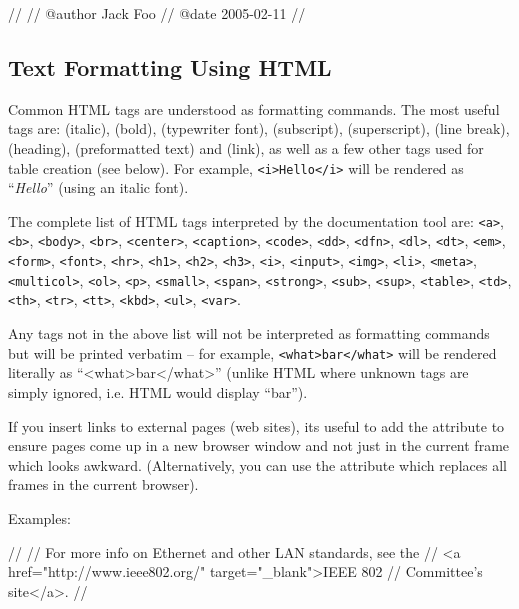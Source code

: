 \begin{ned}
//
// @author Jack Foo
// @date 2005-02-11
//
\end{ned}


\subsection{Text Formatting Using HTML}

Common HTML tags are understood as formatting commands.
The most useful tags are:  (italic),
 (bold),  (typewriter font),
 (subscript),  (superscript),
 (line break),  (heading),
 (preformatted text) and  (link),
as well as a few other tags used for table creation (see below).
For example, \texttt{<i>Hello</i>} will be rendered as ``\textit{Hello}''
(using an italic font).

The complete list of HTML tags interpreted by the documentation tool are:
\texttt{<a>}, \texttt{<b>}, \texttt{<body>}, \texttt{<br>}, \texttt{<center>},
\texttt{<caption>}, \texttt{<code>}, \texttt{<dd>}, \texttt{<dfn>}, \texttt{<dl>},
\texttt{<dt>}, \texttt{<em>}, \texttt{<form>}, \texttt{<font>}, \texttt{<hr>},
\texttt{<h1>}, \texttt{<h2>}, \texttt{<h3>}, \texttt{<i>}, \texttt{<input>}, \texttt{<img>},
\texttt{<li>}, \texttt{<meta>}, \texttt{<multicol>}, \texttt{<ol>}, \texttt{<p>}, \texttt{<small>},
\texttt{<span>}, \texttt{<strong>},
\texttt{<sub>}, \texttt{<sup>}, \texttt{<table>}, \texttt{<td>}, \texttt{<th>}, \texttt{<tr>},
\texttt{<tt>}, \texttt{<kbd>}, \texttt{<ul>}, \texttt{<var>}.

Any tags not in the above list will not be interpreted as formatting commands
but will be printed verbatim -- for example, \texttt{<what>bar</what>}
will be rendered literally as ``<what>bar</what>'' (unlike HTML where
unknown tags are simply ignored, i.e. HTML would display ``bar'').

If you insert links to external pages (web sites), its useful to add
the  attribute to ensure pages come up in a new
browser window and not just in the current frame which looks awkward.
(Alternatively, you can use the  attribute
which replaces all frames in the current browser).

Examples:

\begin{ned}
//
// For more info on Ethernet and other LAN standards, see the
// <a href="http://www.ieee802.org/" target="_blank">IEEE 802
// Committee's site</a>.
//
\end{ned}

